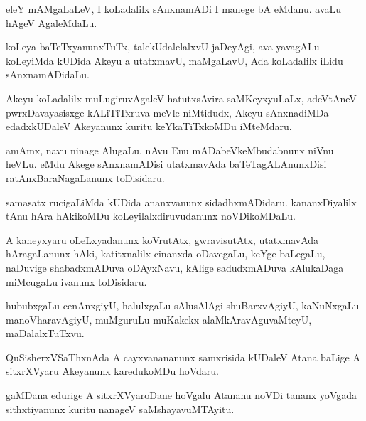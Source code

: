 \documentclass{article}
\begin{document}
\begin{mn}%
eleY mAMgaLaLeV, I koLadalilx sAnxnamADi I manege bA eMdanu. avaLu hAgeV AgaleMdaLu.
\end{mn}

\begin{mn}%
koLeya baTeTxyanunxTuTx, talekUdalelalxvU jaDeyAgi, ava yavagALu koLeyiMda kUDida Akeyu a 
utatxmavU, maMgaLavU, Ada koLadalilx iLidu sAnxnamADidaLu.
\end{mn}

\begin{mn}%
Akeyu koLadalilx muLugiruvAgaleV hatutxsAvira saMKeyxyuLaLx, adeVtAneV pwrxDavayasisxge 
kALiTiTxruva meVle niMtidudx, Akeyu sAnxnadiMDa edadxkUDaleV Akeyanunx kuritu 
keYkaTiTxkoMDu iMteMdaru.
\end{mn}

\begin{mn}%
amAmx, navu ninage AlugaLu. nAvu Enu mADabeVkeMbudabnunx niVnu heVLu. eMdu Akege 
sAnxnamADisi utatxmavAda baTeTagALAnunxDisi ratAnxBaraNagaLanunx toDisidaru.
\end{mn}

\begin{mn}%
samasatx rucigaLiMda kUDida ananxvanunx sidadhxmADidaru. kananxDiyalilx tAnu hAra hAkikoMDu
koLeyilalxdiruvudanunx noVDikoMDaLu.
\end{mn}

\begin{mn}%
A kaneyxyaru oLeLxyadanunx koVrutAtx, gwravisutAtx, utatxmavAda hAragaLanunx hAki, 
katitxnalilx cinanxda oDavegaLu, keYge baLegaLu, naDuvige shabadxmADuva oDAyxNavu, kAlige 
sadudxmADuva kAlukaDaga miMcugaLu ivanunx toDisidaru.
\end{mn}

\begin{mn}%
hububxgaLu cenAnxgiyU, halulxgaLu sAlusAlAgi shuBarxvAgiyU, kaNuNxgaLu manoVharavAgiyU, 
muMguruLu muKakekx alaMkAravAguvaMteyU, maDalalxTuTxvu.
\end{mn}

\begin{mn}%
QuSisherxVSaThxnAda A cayxvanananunx samxrisida kUDaleV Atana baLige A sitxrXVyaru 
Akeyanunx karedukoMDu hoVdaru.
\end{mn}

\begin{mn}%
gaMDana edurige A sitxrXVyaroDane hoVgalu Atananu noVDi tananx yoVgada sithxtiyanunx 
kuritu nanageV saMshayavuMTAyitu.
\end{mn}
\end{document}
